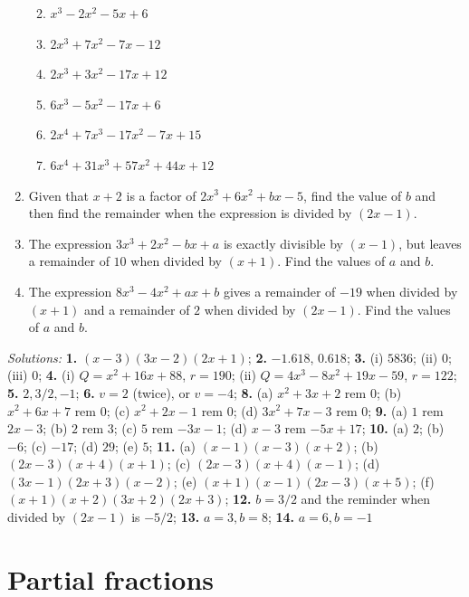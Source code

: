 \documentclass[
  12pt,
  oneside]{book}
\providecommand{\tightlist}{%
  \setlength{\itemsep}{0pt}\setlength{\parskip}{0pt}}
\theoremstyle{definition}
\theoremstyle{definition}
\theoremstyle{definition}
\theoremstyle{definition}
\theoremstyle{remark}
\begin{document}
\begin{enumerate}
  \begin{enumerate}
  \def\labelenumii{\alph{enumii})}
  \tightlist
  \item
    \(x^3 - 2x^2 - 5x + 6\)
  \item
    \(2x^3 + 7x^2 - 7x - 12\)
  \item
    \(2x^3 + 3x^2 - 17x + 12\)
  \item
    \(6x^3 - 5x^2 - 17x + 6\)
  \item
    \(2x^4 + 7x^3 - 17x^2 -7x + 15\)
  \item
    \(6x^4 + 31x^3 + 57x^2 + 44x + 12\)
  \end{enumerate}
\item
  Given that \(x + 2\) is a factor of \(2x^3 + 6x^2 + bx - 5\), find the value of \(b\) and then find the remainder when the expression is divided by \((2x - 1)\).
\item
  The expression \(3x^3 + 2x^2 - bx + a\) is exactly divisible by \((x - 1)\), but leaves a remainder of \(10\) when divided by \((x + 1)\). Find the values of \(a\) and \(b\).
\item
  The expression \(8x^3 - 4x^2 + ax + b\) gives a remainder of \(-19\) when divided by \((x + 1)\) and a remainder of \(2\) when divided by \((2x - 1)\). Find the values of \(a\) and \(b\).
\end{enumerate}

\emph{Solutions:}
\textbf{1.} \((x-3)(3x-2)(2x+1)\);
\textbf{2.} \(-1.618\), \(0.618\);
\textbf{3.} (i) \(5836\); (ii) \(0\); (iii) \(0\);
\textbf{4.} (i) \(Q=x^2+16x+88\), \(r=190\); (ii) \(Q=4x^3-8x^2+19x-59\), \(r=122\);
\textbf{5.} \(2,3/2,-1\);
\textbf{6.} \(v=2\) (twice), or \(v=-4\);
\textbf{8.} (a) \(x^2+3x+2\) rem \(0\); (b) \(x^2+6x+7\) rem \(0\); (c) \(x^2+2x-1\) rem \(0\); (d) \(3x^2+7x-3\) rem \(0\);
\textbf{9.} (a) \(1\) rem \(2x-3\); (b) \(2\) rem \(3\); (c) \(5\) rem \(-3x-1\); (d) \(x-3\) rem \(-5x+17\);
\textbf{10.} (a) \(2\); (b) \(-6\); (c) \(-17\); (d) \(29\); (e) \(5\);
\textbf{11.} (a) \((x -1)(x - 3)(x + 2)\); (b) \((2x - 3)(x + 4)(x + 1)\); (c) \((2x - 3)(x + 4)(x - 1)\); (d) \((3x - 1)(2x + 3)(x - 2)\); (e) \((x + 1)(x - 1)(2x - 3)(x + 5)\); (f) \((x + 1)(x + 2)(3x + 2)(2x + 3)\);
\textbf{12.} \(b = 3/2\) and the reminder when divided by \((2x-1)\) is \(-5/2\);
\textbf{13.} \(a=3, b=8\);
\textbf{14.} \(a=6,b=-1\)

\chapter{Partial fractions}\label{partial-fractions}
\end{document}
